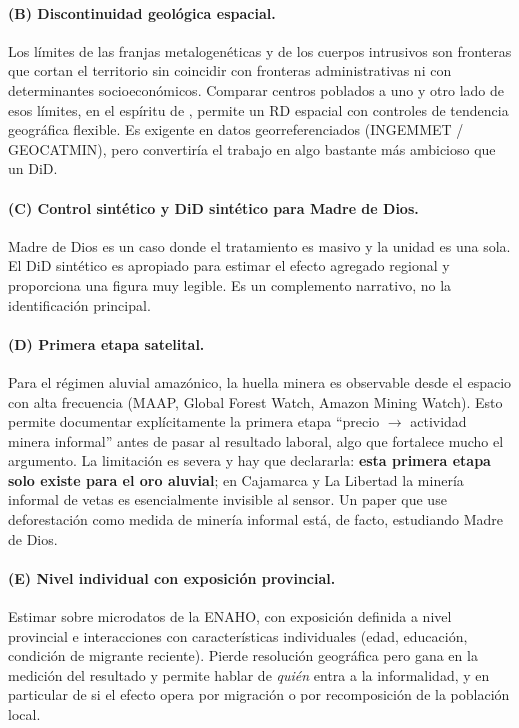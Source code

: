 \documentclass[11pt,a4paper]{article}
\begin{document}
\paragraph{(B) Discontinuidad geológica espacial.} Los límites de las franjas metalogenéticas y de los cuerpos intrusivos son fronteras que cortan el territorio sin coincidir con fronteras administrativas ni con determinantes socioeconómicos. Comparar centros poblados a uno y otro lado de esos límites, en el espíritu de \citet{dell2010}, permite un RD espacial con controles de tendencia geográfica flexible. Es exigente en datos georreferenciados (INGEMMET / GEOCATMIN), pero convertiría el trabajo en algo bastante más ambicioso que un DiD.

\paragraph{(C) Control sintético y DiD sintético para Madre de Dios.} Madre de Dios es un caso donde el tratamiento es masivo y la unidad es una sola. El DiD sintético \citep{arkhangelsky2021} es apropiado para estimar el efecto agregado regional y proporciona una figura muy legible. Es un complemento narrativo, no la identificación principal.

\paragraph{(D) Primera etapa satelital.} Para el régimen aluvial amazónico, la huella minera es observable desde el espacio con alta frecuencia (MAAP, Global Forest Watch, Amazon Mining Watch). Esto permite documentar explícitamente la primera etapa ``precio $\to$ actividad minera informal'' antes de pasar al resultado laboral, algo que fortalece mucho el argumento. La limitación es severa y hay que declararla: \textbf{esta primera etapa solo existe para el oro aluvial}; en Cajamarca y La Libertad la minería informal de vetas es esencialmente invisible al sensor. Un paper que use deforestación como medida de minería informal está, de facto, estudiando Madre de Dios.

\paragraph{(E) Nivel individual con exposición provincial.} Estimar sobre microdatos de la ENAHO, con exposición definida a nivel provincial e interacciones con características individuales (edad, educación, condición de migrante reciente). Pierde resolución geográfica pero gana en la medición del resultado y permite hablar de \emph{quién} entra a la informalidad, y en particular de si el efecto opera por migración o por recomposición de la población local.
\end{document}
